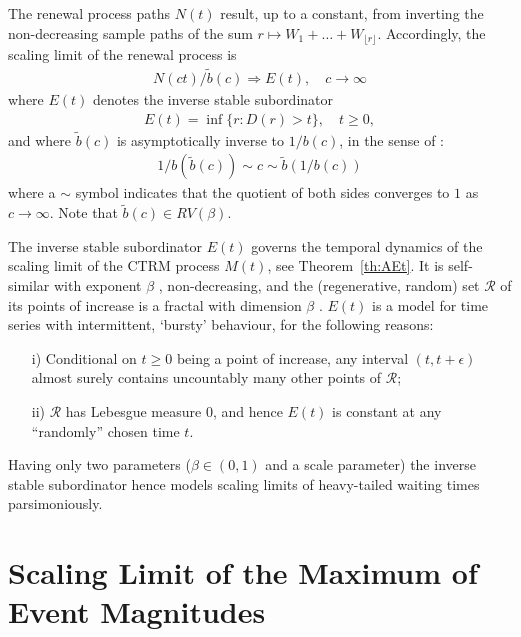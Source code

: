 \documentclass[honours,12pt]{UNSWthesis}
\newcommand{\1}{\mathbf 1}
\numberwithin{equation}{section}
\theoremstyle{definition}
\theoremstyle{remark}
\begin{document}
The renewal process paths $N(t)$ result, up to a constant, from
inverting the non-decreasing sample paths of the sum
$r \mapsto W_1 + \ldots + W_{\lfloor r \rfloor}$.
Accordingly, the scaling limit of the renewal process is \cite{limitCTRW} 
\begin{align}
N(ct) / \tilde b(c) \Rightarrow E(t), \quad c \to \infty
\end{align}
where $E(t)$ denotes the inverse stable subordinator \cite{invSubord}
\begin{align}
E(t) = \inf\{r: D(r) > t\}, \quad t \ge 0,
\end{align}
and where $\tilde b(c)$ is asymptotically inverse to $1/b(c)$, in the sense
of \cite[p.20]{seneta}: 
\begin{align}
1/b(\tilde b(c)) \sim c \sim \tilde b(1/b(c))
\end{align}
where a $\sim$ symbol indicates that the quotient of both sides converges to
$1$ as $c \to \infty$. 
Note that $\tilde b(c) \in RV(\beta)$. 

The inverse stable subordinator $E(t)$ governs the temporal dynamics of
the scaling limit of the CTRM process $M(t)$, see Theorem~\ref{th:AEt}. 
It is self-similar with exponent $\beta$
\cite{limitCTRW}, non-decreasing, and the (regenerative, random) set 
$\mathcal R$ of its points of increase is a fractal with dimension $\beta$ 
\cite{Bertoin04}.
$E(t)$ is a model for time series with intermittent, `bursty'
behaviour, for the following reasons:
\begin{itemize}
\item [i)]
Conditional on $t \ge 0$ being a point of increase, any interval 
$(t, t+ \epsilon)$ almost surely contains uncountably many other points of 
$\mathcal R$; 
\item [ii)]
$\mathcal R$ has Lebesgue measure $0$, and hence $E(t)$ is
constant at any ``randomly'' chosen time $t$. 
\end{itemize}
Having only two parameters ($\beta \in (0,1)$ and a scale parameter)
the inverse stable subordinator hence models scaling limits of heavy-tailed 
waiting times parsimoniously.

\section{Scaling Limit of the Maximum of Event Magnitudes}\label{s-max}
\end{document}
